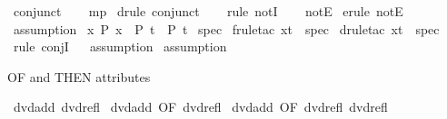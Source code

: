 \begin{isabellebody}
\ conjunct{}\isanewline
\ \ \isamarkupfalse%
\ mp\isanewline
%
\isadelimproof
%
\endisadelimproof
%
\isatagproof
{}\isamarkupfalse%
\ {\isacharparenleft}{\kern0pt}drule\ conjunct{}{\isacharparenright}{\kern0pt}\isanewline
\ \ \isamarkupfalse%
\ {\isacharparenleft}{\kern0pt}rule\ notI{\isacharparenright}{\kern0pt}\isanewline
\ \ \isamarkupfalse%
\ notE\isanewline
{}\isamarkupfalse%
\ {\isacharparenleft}{\kern0pt}erule\ notE{\isacharparenright}{\kern0pt}\isanewline
{}\isamarkupfalse%
\ assumption\isanewline
{}\isamarkupfalse%
%
\endisatagproof
{\isafoldproof}%
%
\isadelimproof
\isanewline
%
\endisadelimproof
\isanewline
\isanewline
{}\isamarkupfalse%
\ {\isachardoublequoteopen}{\isasymforall}x{\isachardot}{\kern0pt}\ P\ x\ {\isasymLongrightarrow}\ P\ t\ {\isasymand}\ P\ t{\isacharprime}{\kern0pt}{\isachardoublequoteclose}\isanewline
{}\isamarkupfalse%
\ spec\isanewline
%
\isadelimproof
%
\endisadelimproof
%
\isatagproof
{}\isamarkupfalse%
\ {\isacharparenleft}{\kern0pt}frule{\isacharunderscore}{\kern0pt}tac\ x{\isacharequal}{\kern0pt}{\isachardoublequoteopen}t{\isachardoublequoteclose}\ \ spec{\isacharparenright}{\kern0pt}\isanewline
{}\isamarkupfalse%
\ {\isacharparenleft}{\kern0pt}drule{\isacharunderscore}{\kern0pt}tac\ x{\isacharequal}{\kern0pt}{\isachardoublequoteopen}t{\isacharprime}{\kern0pt}{\isachardoublequoteclose}\ \ spec{\isacharparenright}{\kern0pt}\isanewline
{}\isamarkupfalse%
\ {\isacharparenleft}{\kern0pt}rule\ conjI{\isacharparenright}{\kern0pt}\isanewline
\ \isamarkupfalse%
\ assumption\isanewline
{}\isamarkupfalse%
\ assumption\isanewline
{}\isamarkupfalse%
%
\endisatagproof
{\isafoldproof}%
%
\isadelimproof
%
\endisadelimproof
%
\begin{isamarkuptext}%
OF and THEN attributes%
\end{isamarkuptext}\isamarkuptrue%
\isamarkupfalse%
\ dvd{\isacharunderscore}{\kern0pt}add\ dvd{\isacharunderscore}{\kern0pt}refl\isanewline
{}\isamarkupfalse%
\ dvd{\isacharunderscore}{\kern0pt}add\ {\isacharbrackleft}{\kern0pt}OF\ dvd{\isacharunderscore}{\kern0pt}refl{\isacharbrackright}{\kern0pt}\isanewline
{}\isamarkupfalse%
\ dvd{\isacharunderscore}{\kern0pt}add\ {\isacharbrackleft}{\kern0pt}OF\ dvd{\isacharunderscore}{\kern0pt}refl\ dvd{\isacharunderscore}{\kern0pt}refl{\isacharbrackright}{\kern0pt}%

\end{isabellebody}
